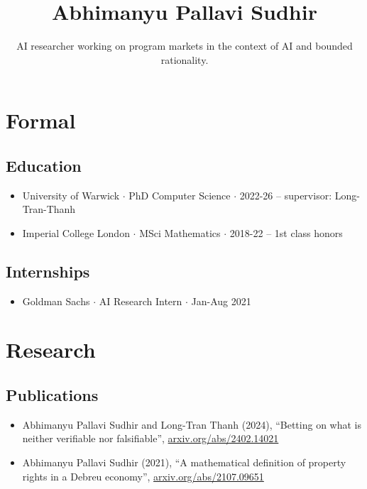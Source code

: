 \documentclass{article}
\title{\Large\bf Abhimanyu Pallavi Sudhir}
\subtitle{AI researcher working on program markets in the context of AI and bounded rationality. \\ %
\vspace{-2em}}
\begin{document}
\begingroup
\let\center\flushleft
\let\endcenter\endflushleft
\maketitle
\endgroup

\section*{Formal}

\subsection*{Education}
\begin{itemize}
    \item University of Warwick $\cdot$ PhD Computer Science $\cdot$ 2022-26 -- supervisor: Long-Tran-Thanh %
    \item Imperial College London $\cdot$ MSci Mathematics $\cdot$ 2018-22 -- 1st class honors
\end{itemize}

\subsection*{Internships}
\begin{itemize}
    \item Goldman Sachs $\cdot$ AI Research Intern $\cdot$ Jan-Aug 2021%
\end{itemize}

\section*{Research}

\subsection*{Publications}

\begin{itemize}

\item 
Abhimanyu Pallavi Sudhir and Long-Tran Thanh (2024), ``Betting on what is neither verifiable nor falsifiable'', \href{https://arxiv.org/abs/2402.14021}{arxiv.org/abs/2402.14021}

\item
Abhimanyu Pallavi Sudhir (2021),
``A mathematical definition of property rights in a Debreu economy'', 
\href{https://arxiv.org/abs/2107.09651}{arxiv.org/abs/2107.09651}

\end{itemize}
\end{document}
